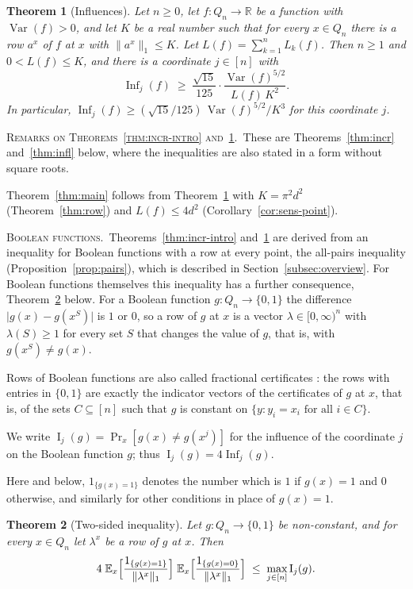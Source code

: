 \documentclass[11pt,reqno]{amsart}
\newtheorem{theorem}{Theorem}[section]
\theoremstyle{definition}
\theoremstyle{remark}
\numberwithin{equation}{section}
\theoremstyle{named}
\theoremstyle{plain}
\newcommand{\introhead}[1]{\par\medskip\noindent\textsc{#1.}\ }
\newcommand{\R}{\mathbb{R}}
\newcommand{\E}{\mathbb{E}}
\newcommand{\Var}{\operatorname{Var}}
\newcommand{\Inf}{\operatorname{Inf}}
\newcommand{\I}{\operatorname{I}}
\newcommand{\norm}[1]{\lVert #1\rVert_1}
\newcommand{\abs}[1]{\lvert #1\rvert}
\begin{document}
\begin{theorem}[Influences]\label{thm:infl-intro}
Let $n\ge0$, let $f\colon Q_n\to\R$ be a function with $\Var(f)>0$, and let $K$ be a real number
such that for every $x\in Q_n$ there is a row $a^{x}$ of $f$ at $x$ with $\norm{a^{x}}\le K$. Let
$L(f)=\sum_{k=1}^{n}L_k(f)$. Then $n\ge1$ and $0<L(f)\le K$, and there is a coordinate $j\in[n]$
with
\[
   \Inf_j(f)\;\ge\;\frac{\sqrt{15}}{125}\cdot\frac{\Var(f)^{5/2}}{L(f)\,K^{2}} .
\]
In particular, $\Inf_j(f)\ge(\sqrt{15}/125)\,\Var(f)^{5/2}/K^{3}$ for this coordinate $j$.
\end{theorem}

\introhead{Remarks on Theorems~\ref{thm:incr-intro} and~\ref{thm:infl-intro}}These are Theorems~\ref{thm:incr} and~\ref{thm:infl} below, where the inequalities are also stated
in a form without square roots.

Theorem~\ref{thm:main} follows from
Theorem~\ref{thm:infl-intro} with $K=\pi^{2}d^{2}$ (Theorem~\ref{thm:row}) and $L(f)\le4d^{2}$
(Corollary~\ref{cor:sens-point}).

\introhead{Boolean functions}Theorems~\ref{thm:incr-intro} and~\ref{thm:infl-intro} are derived from an inequality for Boolean functions with a row at every point,
the all-pairs inequality (Proposition~\ref{prop:pairs}), which is described in Section~\ref{subsec:overview}. For Boolean
functions themselves this inequality has a further consequence, Theorem~\ref{thm:two-intro} below.
For a Boolean function $g\colon Q_n\to\{0,1\}$ the difference $\abs{g(x)-g(x^{S})}$ is $1$ or $0$,
so a row of $g$ at $x$ is a vector $\lambda\in[0,\infty)^{n}$ with $\lambda(S)\ge1$ for every set $S$
that changes the value of $g$, that is, with $g(x^{S})\ne g(x)$.

Rows of Boolean functions are also called fractional certificates \cite{Tal,GSS,KT}: the rows with
entries in $\{0,1\}$ are exactly the
indicator vectors of the certificates of $g$ at $x$, that is, of the sets $C\subseteq[n]$ such that $g$
is constant on $\{y : y_i=x_i \text{ for all } i\in C\}$.

We write $\I_j(g)=\Pr_x[g(x)\ne g(x^{j})]$ for the influence of the
coordinate $j$ on the Boolean function $g$; thus $\I_j(g)=4\Inf_j(g)$.

Here and below,
$1_{\{g(x)=1\}}$ denotes the number which is $1$ if $g(x)=1$ and $0$ otherwise, and similarly for other
conditions in place of $g(x)=1$.

\begin{theorem}[Two-sided inequality]\label{thm:two-intro}
Let $g\colon Q_n\to\{0,1\}$ be non-constant, and for every $x\in Q_n$ let $\lambda^{x}$ be a row
of $g$ at $x$. Then
\[
   4\;\E_x\Bigl[\frac{1_{\{g(x)=1\}}}{\norm{\lambda^{x}}}\Bigr]\;
      \E_x\Bigl[\frac{1_{\{g(x)=0\}}}{\norm{\lambda^{x}}}\Bigr]\;\le\;\max_{j\in[n]}\I_j(g).
\]
\end{theorem}
\end{document}
